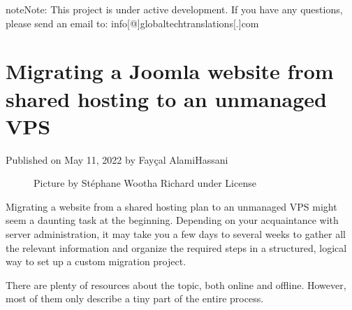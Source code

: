 \documentclass[a4paper,10pt,english,openany,oneside]{sphinxmanual}
\begin{document}
\begin{sphinxadmonition}{note}{Note:}
\sphinxAtStartPar
This project is under active development. If you have any questions, please send an email to: info{[}@{]}globaltech\sphinxhyphen{}translations{[}.{]}com \sphinxhyphen{} 
\end{sphinxadmonition}

\sphinxstepscope


\chapter{Migrating a Joomla website from shared hosting to an unmanaged VPS}
\label{\detokenize{joomla-to-vps:migrating-a-joomla-website-from-shared-hosting-to-an-unmanaged-vps}}\label{\detokenize{joomla-to-vps::doc}}
\sphinxAtStartPar
Published on May 11, 2022 by Fayçal Alami\sphinxhyphen{}Hassani %
\begin{footnote}[5]\sphinxAtStartFootnote
{}
%
\end{footnote}

\begin{figure}[H]
\centering
\capstart

\noindent{}
\caption{Picture by Stéphane Wootha Richard under \sphinxfootnotemark[6] License}\label{\detokenize{joomla-to-vps:id1}}\end{figure}
%
\begin{footnotetext}[6]\label{\thesphinxscope.6}%
\sphinxAtStartFootnote
{}
%
\end{footnotetext}\ignorespaces 
\sphinxAtStartPar
Migrating a website from a shared hosting plan to an unmanaged VPS might seem a daunting task at the beginning. Depending on your acquaintance with server administration, it may take you a few days to several weeks to gather all the relevant information and organize the required steps in a structured, logical way to set up a custom migration project.

\sphinxAtStartPar
There are plenty of resources about the topic, both online and offline. However, most of them only describe a tiny part of the entire process.
\end{document}
